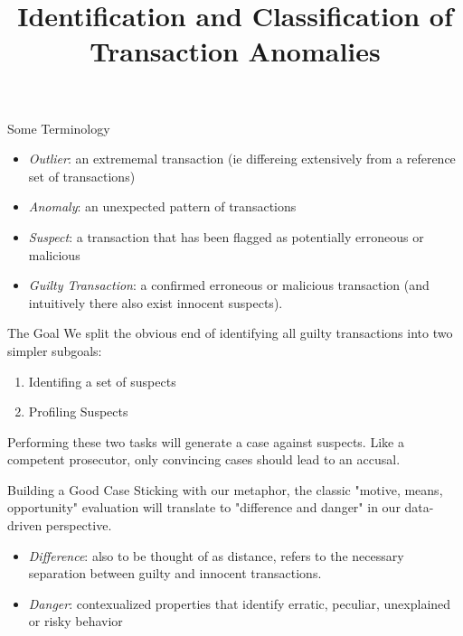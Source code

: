 \documentclass[aspectratio=169]{beamer}
\title[Transaction Anomaly Detection]{Identification and Classification of Transaction Anomalies}
\institute{Applying isolation outlier detection and topological profiling to GL Transaction data.}
\begin{document}
  \begin{frame}
  \setlength {\marginparwidth }{2cm}
    \titlepage
  \end{frame}

\begin{frame}{Some Terminology}
  \begin{itemize}
    \item \textit{Outlier}: an extrememal transaction (ie differeing extensively from a reference set of transactions) 
    \item \textit{Anomaly}: an unexpected pattern of transactions
    \item \textit{Suspect}: a transaction that has been flagged as potentially erroneous or malicious
    \item \textit{Guilty Transaction}: a confirmed erroneous or malicious transaction (and intuitively there also exist innocent suspects).
  \end{itemize}
\end{frame}

\begin{frame}{The Goal}
We split the obvious end of identifying all guilty transactions into two simpler subgoals: 
\begin{enumerate}
  \item Identifing a set of suspects 
  \item Profiling Suspects 
\end{enumerate}
Performing these two tasks will generate a case against suspects. Like a competent prosecutor, only convincing cases should 
lead to an accusal. 
\end{frame}
  \begin{frame}{Building a Good Case}
    Sticking with our metaphor, the classic "motive, means, opportunity" evaluation
    will translate to "difference and danger" in our data-driven perspective. 
    \begin{itemize}
      \item \textit{Difference}: also to be thought of as distance, refers to the necessary 
      separation between guilty and innocent transactions.  
      \item \textit{Danger}: contexualized properties that identify erratic, peculiar, 
    unexplained or risky behavior    
    \end{itemize}
    
  \end{frame}
\end{document}
